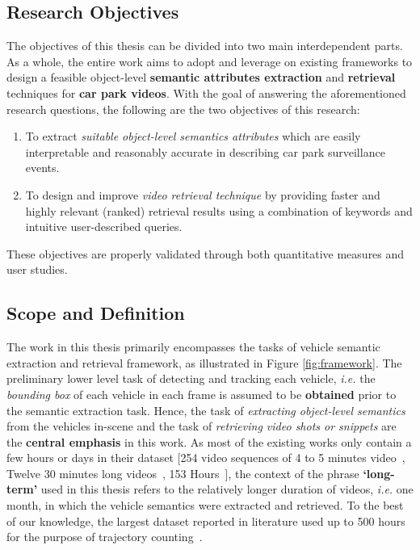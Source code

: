 \vspace{1em}
\subsection{Research Objectives}
The objectives of this thesis can be divided into two main interdependent parts. As a whole, the entire work aims to adopt and leverage on existing frameworks to design a feasible object-level \textbf{semantic attributes extraction} and \textbf{retrieval} techniques for \textbf{car park videos}.
With the goal of answering the aforementioned research questions, the following are the two objectives of this research:

\begin{enumerate}[start=1,label={(\bfseries O\arabic*):}]
  \item To extract \textit{suitable object-level semantics attributes} which are easily interpretable and reasonably accurate in describing car park surveillance events.
  \item To design and improve \textit{video retrieval technique} by providing faster and highly relevant (ranked) retrieval results using a combination of keywords and intuitive user-described queries.
\end{enumerate}
\noindent These objectives are properly validated through both quantitative measures and user studies.

\vspace{1em}
\subsection{Scope and Definition}
\label{subsec:scope}
The work in this thesis primarily encompasses the tasks
of vehicle semantic extraction and retrieval framework, as illustrated in Figure \ref{fig:framework}. The preliminary lower level task of detecting and tracking each vehicle, \emph{i.e.} the \textit{bounding box} of each vehicle in each frame is assumed to be \textbf{obtained} prior to the semantic extraction task.
Hence, the task of \textit{extracting object-level semantics} from the vehicles in-scene and the task of \textit{retrieving video shots or snippets} are the \textbf{central emphasis} in this work.
As most of the existing works only contain a few hours or days in their dataset [254 video sequences of 4 to 5 minutes video~\cite{liu2016highway}, Twelve 30 minutes long videos~\cite{marmol2016quickspot}, 153 Hours~\cite{ren2018learning}], the context of the phrase \textbf{`long-term'} used in this thesis refers to the relatively longer duration of videos, \emph{i.e.} one month, in which the vehicle semantics were extracted and retrieved. To the best of our knowledge, the largest dataset reported in literature used up to 500 hours for the purpose of trajectory counting~\cite{lessard2016countingapp}.


